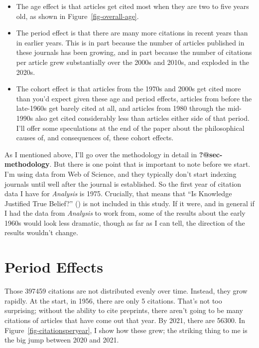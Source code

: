 \documentclass[
  12pt,
  letterpaper,
  DIV=11,
  numbers=noendperiod]{scrartcl}
\providecommand{\tightlist}{%
  \setlength{\itemsep}{0pt}\setlength{\parskip}{0pt}}\usepackage{longtable,booktabs,array}
\begin{document}
\begin{itemize}
\tightlist
\item
  The age effect is that articles get cited most when they are two to
  five years old, as shown in Figure~\ref{fig-overall-age}.
\item
  The period effect is that there are many more citations in recent
  years than in earlier years. This is in part because the number of
  articles published in these journals has been growing, and in part
  because the number of citations per article grew substantially over
  the 2000s and 2010s, and exploded in the 2020s.
\item
  The cohort effect is that articles from the 1970s and 2000s get cited
  more than you'd expect given these age and period effects, articles
  from before the late-1960s get barely cited at all, and articles from
  1980 through the mid-1990s also get cited considerably less than
  articles either side of that period. I'll offer some speculations at
  the end of the paper about the philosophical causes of, and
  consequences of, these cohort effects.
\end{itemize}

As I mentioned above, I'll go over the methodology in detail in
\textbf{?@sec-methodology}. But there is one point that is important to
note before we start. I'm using data from Web of Science, and they
typically don't start indexing journals until well after the journal is
established. So the first year of citation data I have for
\emph{Analysis} is 1975. Crucially, that means that ``Is Knowledge
Justified True Belief?'' () is
not included in this study. If it were, and in general if I had the data
from \emph{Analysis} to work from, some of the results about the early
1960s would look less dramatic, though as far as I can tell, the
direction of the results wouldn't change.

\section{Period Effects}\label{sec-period}

Those 397459 citations are not distributed evenly over time. Instead,
they grow rapidly. At the start, in 1956, there are only 5 citations.
That's not too surprising; without the ability to cite preprints, there
aren't going to be many citations of articles that have come out that
year. By 2021, there are 56300. In Figure~\ref{fig-citationsperyear}, I
show how these grew; the striking thing to me is the big jump between
2020 and 2021.
\end{document}
